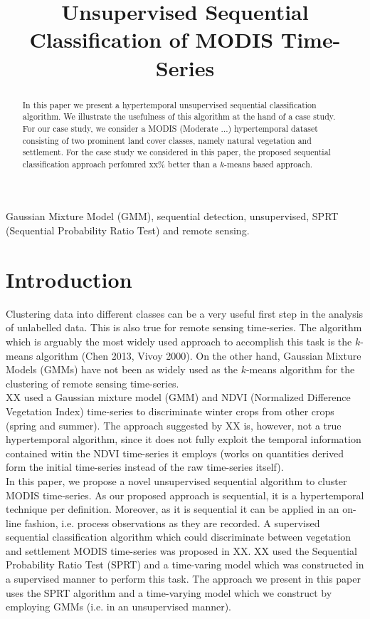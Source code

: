 \documentclass{article}
\title{Unsupervised Sequential Classification of MODIS Time-Series}
\begin{document}
%
\maketitle
%
\begin{abstract}
In this paper we present a hypertemporal unsupervised sequential classification algorithm.  
We illustrate the usefulness of this algorithm at the hand of a case study. For our case study, we consider a MODIS (Moderate ...) hypertemporal dataset consisting of two prominent land cover classes, namely natural vegetation and settlement. For the 
case study we considered in this paper, the proposed sequential classification approach perfomred xx\% better than a $k$-means based approach.
\end{abstract}
%
\begin{keywords}
Gaussian Mixture Model (GMM), sequential detection, unsupervised, SPRT (Sequential Probability Ratio Test) and remote sensing.
\end{keywords}
%

\section{Introduction}
\label{sec:intro}
Clustering data into different classes can be a very useful first step in the analysis of unlabelled data. This is also true for remote sensing time-series. The algorithm
which is arguably the most widely used approach to accomplish this task is the $k$-means algorithm (Chen 2013, Vivoy 2000). On the other hand, Gaussian Mixture Models (GMMs) have not been 
as widely used as the $k$-means algorithm for the clustering of remote sensing time-series. \\

\noindent
XX used a Gaussian mixture model (GMM) and NDVI (Normalized Difference Vegetation Index) time-series to discriminate winter crops from other crops (spring and summer).
The approach suggested by XX is, however, not a true hypertemporal algorithm, since it does not fully exploit the temporal information contained witin the NDVI time-series it employs (works on quantities derived 
form the initial time-series instead of the raw time-series itself).\\

\noindent
In this paper, we propose a novel unsupervised sequential algorithm to cluster MODIS time-series. As our proposed approach is sequential, it is a hypertemporal technique per definition.
Moreover, as it is sequential it can be applied in an on-line fashion, i.e. process observations as they are recorded. A supervised sequential classification algorithm which could discriminate 
between vegetation and settlement MODIS time-series was proposed in XX. XX used the Sequential Probability Ratio Test (SPRT) and a time-varing model which was constructed in a supervised manner to perform this task. 
The approach we present in this paper uses the SPRT algorithm and a time-varying model which we construct by employing GMMs (i.e. in an unsupervised manner).\\
\end{document}
